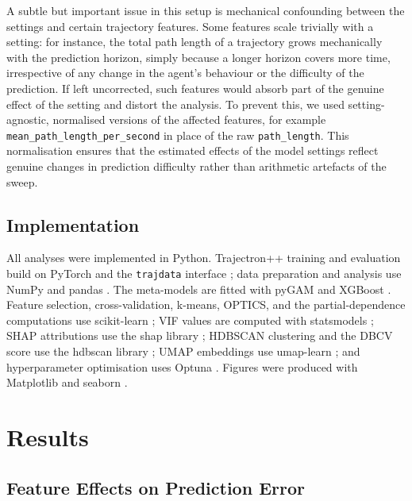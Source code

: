 \documentclass[12pt]{article}
\begin{document}
A subtle but important issue in this setup is mechanical confounding between the settings and certain trajectory features. Some features scale trivially with a setting: for instance, the total path length of a trajectory grows mechanically with the prediction horizon, simply because a longer horizon covers more time, irrespective of any change in the agent's behaviour or the difficulty of the prediction. If left uncorrected, such features would absorb part of the genuine effect of the setting and distort the analysis. To prevent this, we used setting-agnostic, normalised versions of the affected features, for example \texttt{mean\_path\_length\_per\_second} in place of the raw \texttt{path\_length}. This normalisation ensures that the estimated effects of the model settings reflect genuine changes in prediction difficulty rather than arithmetic artefacts of the sweep.

\subsection{Implementation}

All analyses were implemented in Python. Trajectron++ training and evaluation build on PyTorch \citep{paszke2019pytorch} and the \texttt{trajdata} interface \citep{ivanovic2023trajdata}; data preparation and analysis use NumPy \citep{harris2020numpy} and pandas \citep{mckinney2010pandas}. The meta-models are fitted with pyGAM \citep{serven2025pygam} and XGBoost \citep{chen2016xgboost}. Feature selection, cross-validation, k-means, OPTICS, and the partial-dependence computations use scikit-learn \citep{pedregosa2011sklearn}; VIF values are computed with statsmodels \citep{seabold2010statsmodels}; SHAP attributions use the shap library \citep{lundberg2017shap}; HDBSCAN clustering and the DBCV score use the hdbscan library \citep{mcinnes2017hdbscan}; UMAP embeddings use umap-learn \citep{mcinnes2018umap}; and hyperparameter optimisation uses Optuna \citep{akiba2019optuna}. Figures were produced with Matplotlib \citep{hunter2007matplotlib} and seaborn \citep{waskom2021seaborn}.

\clearpage
\section{Results}

\subsection{Feature Effects on Prediction Error}
\label{sec:rq1_results}
\end{document}
